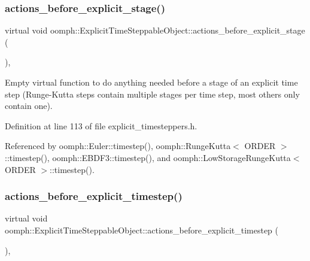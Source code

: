 \subsubsection{\texorpdfstring{actions\+\_\+before\+\_\+explicit\+\_\+stage()}{actions\_before\_explicit\_stage()}}
{\footnotesize\ttfamily virtual void oomph\+::\+Explicit\+Time\+Steppable\+Object\+::actions\+\_\+before\+\_\+explicit\+\_\+stage (\begin{DoxyParamCaption}{ }\end{DoxyParamCaption})\hspace{0.3cm}{\ttfamily [inline]}, {\ttfamily [virtual]}}



Empty virtual function to do anything needed before a stage of an explicit time step (Runge-\/\+Kutta steps contain multiple stages per time step, most others only contain one). 



Definition at line 113 of file explicit\+\_\+timesteppers.\+h.



Referenced by oomph\+::\+Euler\+::timestep(), oomph\+::\+Runge\+Kutta$<$ O\+R\+D\+E\+R $>$\+::timestep(), oomph\+::\+E\+B\+D\+F3\+::timestep(), and oomph\+::\+Low\+Storage\+Runge\+Kutta$<$ O\+R\+D\+E\+R $>$\+::timestep().

\mbox{\label{classoomph_1_1ExplicitTimeSteppableObject_ae169b713aa971921bfd1269de898b934}} 
\subsubsection{\texorpdfstring{actions\+\_\+before\+\_\+explicit\+\_\+timestep()}{actions\_before\_explicit\_timestep()}}
{\footnotesize\ttfamily virtual void oomph\+::\+Explicit\+Time\+Steppable\+Object\+::actions\+\_\+before\+\_\+explicit\+\_\+timestep (\begin{DoxyParamCaption}{ }\end{DoxyParamCaption})\hspace{0.3cm}{\ttfamily [inline]}, {\ttfamily [virtual]}}



